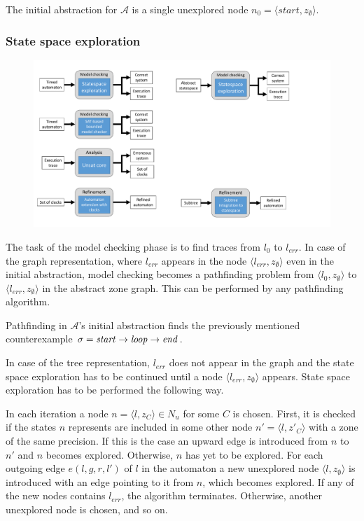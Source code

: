 \begin{runningExample}
	The initial abstraction for $\mathcal{A}$ is a single unexplored node $n_0=\langle \textit{start}, z_{\emptyset} \rangle$.
\end{runningExample}


\subsubsection{State space exploration}

\begin{figure}[h]
	\centering
	\includegraphics[width=.7\textwidth]{include/figures/modules_ssp_mc}
\end{figure}

The task of the model checking phase is to find traces from $l_0$ to $l_{err}$. In case of the graph representation, where $l_{err}$ appears in the node  $\langle l_{err}, z_{\emptyset} \rangle$ even in the initial abstraction, model checking becomes a pathfinding problem from $\langle l_{0}, z_{\emptyset} \rangle$ to $\langle l_{err}, z_{\emptyset} \rangle$ in the abstract zone graph. This can be performed by any pathfinding algorithm.

\begin{runningExample}
	Pathfinding in $\mathcal{A}$'s initial abstraction finds the previously mentioned counterexample $\sigma= \text{\emph{start}} \to \text{\emph{loop}} \to \text{\emph{end}}$.
\end{runningExample}

In case of the tree representation, $l_{err}$ does not appear in the graph and the state space exploration has to be continued until a node $\langle l_{err}, z_{\emptyset} \rangle$ appears. State space exploration has to be performed the following way.

In each iteration a node $n=\langle l, z_{C} \rangle \in N_u$ for some $C$ is chosen. First, it is checked if the states $n$ represents are included in some other node $n'=\langle l, z'_{C} \rangle$ with a zone of the same precision. If this is the case an upward edge is introduced from $n$ to $n'$ and $n$ becomes explored. Otherwise, $n$ has yet to be explored. For each outgoing edge $e(l,g,r,l')$ of $l$ in the automaton a new unexplored node $\langle l, z_{\emptyset} \rangle$ is introduced with an edge pointing to it from $n$, which becomes explored. If any of the new nodes contains $l_{err}$, the algorithm terminates. Otherwise, another unexplored node is chosen, and so on.

